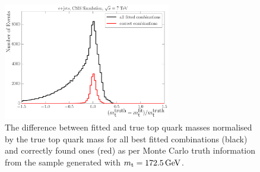 \begin{figure}[!htp]
   \centering
   \includegraphics[width=0.65\textwidth]{correct_fit_combinations}
   \caption[Residuals of the fitted top quark mass]{The difference between fitted and true top quark masses normalised
   by the true top quark mass for all best fitted combinations (black) and correctly found ones (red) as per Monte Carlo
   truth information from the \ttjets sample generated with $\mtop = \SI{172.5}{\GeV}$.}
   \label{fig:fit_performance_plot}
\end{figure}


